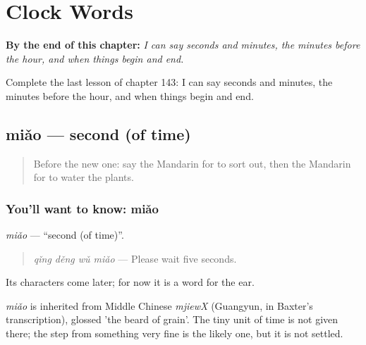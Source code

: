 
\chapter{Clock Words}
\label{ch:zh-clock-words}

\begin{chapteropening}
\textbf{By the end of this chapter:} \emph{I can say seconds and minutes, the minutes before the hour, and when things begin and end.}

Complete the last lesson of chapter 143: I can say seconds and minutes, the minutes before the hour, and when things begin and end.
\end{chapteropening}

\section[miǎo]{miǎo — second (of time)}

\label{lesson:ZH-C143-miao}



\begin{quote}
Before the new one: say the Mandarin for to sort out, then the Mandarin for to water the plants.
\end{quote}

\subsection*{You'll want to know: miǎo}
\emph{miǎo} — \textquotedblleft{}second (of time)\textquotedblright{}.

\begin{quote}
\emph{qǐng děng wǔ miǎo} — Please wait five seconds.
\end{quote}

Its characters come later; for now it is a word for the ear.

\begin{cousinweb}
\emph{miǎo} is inherited from Middle Chinese \emph{mjiewX} (Guangyun, in Baxter's transcription), glossed 'the beard of grain'. The tiny unit of time is not given there; the step from something very fine is the likely one, but it is not settled.
\end{cousinweb}

